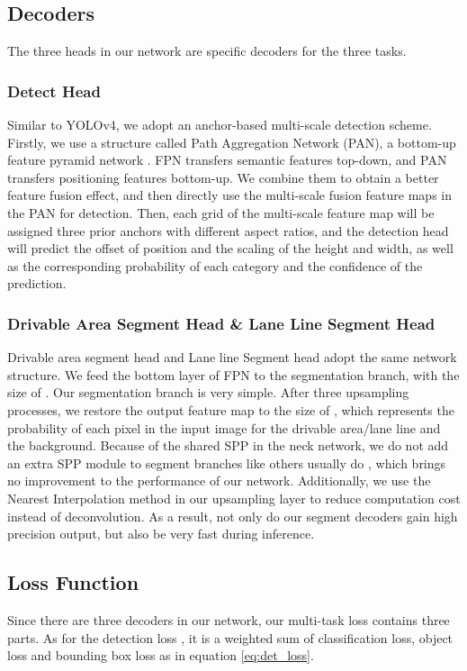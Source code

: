 \documentclass[10pt,twocolumn,letterpaper]{article}
\begin{document}
\subsection{Decoders}
The three heads in our network are specific decoders for the three tasks.

\subsubsection{Detect Head}
Similar to YOLOv4, we adopt an anchor-based multi-scale detection scheme. Firstly, we use a structure called Path Aggregation Network (PAN), a bottom-up feature pyramid network \cite{pannet}. FPN transfers semantic features top-down, and PAN transfers positioning features bottom-up. We combine them to obtain a better feature fusion effect, and then directly use the multi-scale fusion feature maps in the PAN for detection. Then, each grid of the multi-scale feature map will be assigned three prior anchors with different aspect ratios, and the detection head will predict the offset of position and the scaling of the height and width, as well as the corresponding probability of each category and the confidence of the prediction.

\subsubsection{Drivable Area Segment Head \& Lane Line Segment Head}
Drivable area segment head and Lane line Segment head adopt the same network structure. We feed the bottom layer of FPN to the segmentation branch, with the size of . Our segmentation branch is very simple. After three upsampling processes, we restore the output feature map to the size of , which represents the probability of each pixel in the input image for the drivable area/lane line and the background.
Because of the shared SPP in the neck network, we do not add an extra SPP module to segment branches like others usually do \cite{pspnet}, which brings no improvement to the performance of our network. Additionally, we use the Nearest Interpolation method in our upsampling layer to reduce computation cost instead of deconvolution. As a result, not only do our segment decoders gain high precision output, but also be very fast during inference.

\subsection{Loss Function}
Since there are three decoders in our network, our multi-task loss contains three parts. As for the detection loss , it is a weighted sum of classification loss, object loss and bounding box loss as in equation \ref{eq:det_loss}.
\end{document}
